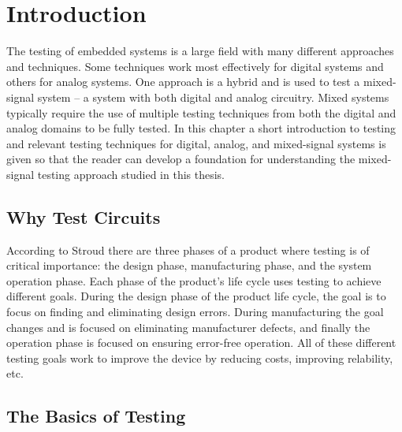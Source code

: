 \documentclass[12pt]{report}
\begin{document}
\normalem       %


\chapter{Introduction}  %

The testing of embedded systems is a large field with many different approaches and techniques.  Some techniques work most effectively for digital systems and others for analog systems.  One approach is a hybrid and is used to test a mixed-signal system -- a system with both digital and analog circuitry.  Mixed systems typically require the use of multiple testing techniques from both the digital and analog domains to be fully tested.  In this chapter a short introduction to testing and relevant testing techniques for digital, analog, and mixed-signal systems is given so that the reader can develop a foundation for understanding the mixed-signal testing approach studied in this thesis. 

\section{Why Test Circuits}
\label{sct:whytest}
According to Stroud\cite{stroud} there are three phases of a product where testing is of critical importance: the design phase, manufacturing phase, and the system operation phase.  Each phase of the product's life cycle uses testing to achieve different goals.  During the design phase of the product life cycle, the goal is to focus on finding and eliminating design errors.  During manufacturing the goal changes and is focused on eliminating manufacturer defects, and finally the operation phase is focused on ensuring error-free operation.  All of these different testing goals work to improve the device by reducing costs, improving relability, etc.  

\section{The Basics of Testing}
\label{sct:basictesting}
\end{document}
